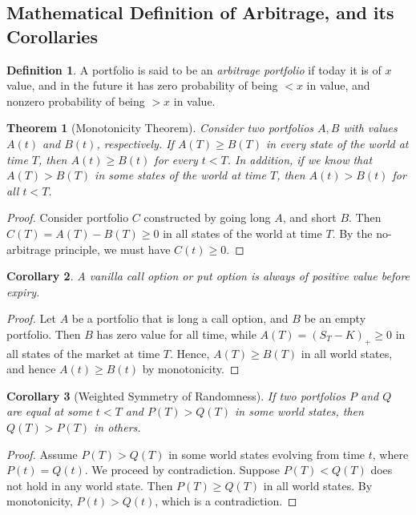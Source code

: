 \documentclass[12pt]{article}
\theoremstyle{plain}
\newtheorem{theorem}{Theorem}
\newtheorem{corollary}[theorem]{Corollary}
\theoremstyle{definition}
\newtheorem*{definition}{Definition}
\theoremstyle{remark}
\numberwithin{equation}{section}  %
\begin{document}
    \subsection{Mathematical Definition of Arbitrage, and its Corollaries}
    \begin{definition}
        A portfolio is said to be an \emph{arbitrage portfolio} if today it is
        of $x$ value, and in the future it has zero probability of being $<x$ in value,
        and nonzero probability of being $>x$ in value. 
    \end{definition}
    \begin{theorem}[Monotonicity Theorem]
    Consider two portfolios $A, B$ with values $A(t)$ and $B(t)$, respectively. 
    If $A(T) \ge B(T)$ in every state of the world at time $T$, then
    $A(t) \ge B(t)$ for every $t < T$. In addition, if we know that
    $A(T) > B(T)$ in some states of the world at time $T$, then
    $A(t) > B(t)$ for all $t < T$. 
    \end{theorem}
    \begin{proof}
    Consider portfolio $C$ constructed by going long $A$, and short $B$. Then
    $C(T) = A(T) - B(T) \ge 0$ in all states of the world at time $T$. 
    By the no-arbitrage principle, we must have $C(t) \ge 0$. \qedhere
    \end{proof}
    \begin{corollary}
    A vanilla call option or put option is always of positive value before expiry.
    \end{corollary}
    \begin{proof}
        Let $A$ be a portfolio that is long a call option, and $B$ be an empty
        portfolio.  Then $B$ has zero value for all time, while $A(T) = {(S_{T}
    - K)}_{+} \ge 0$ in all states of the market at time $T$. Hence, $A(T) \ge
    B(T)$ in all world states, and hence $A(t) \ge B(t)$ by monotonicity.
    \end{proof}
    \begin{corollary}[Weighted Symmetry of Randomness]
    If two portfolios $P$ and $Q$ are equal at some $t < T$ and $P(T) > Q(T)$
    in some world states, then $Q(T) > P(T)$ in others. 
    \end{corollary}
    \begin{proof}
    Assume $P(T) > Q(T)$ in some world states evolving from time $t$, where
    $P(t) = Q(t)$. We proceed by contradiction. Suppose $P(T) < Q(T)$ does not hold
    in any world state. Then $P(T) \ge Q(T)$ in all world states. By monotonicity,
    $P(t) > Q(t)$, which is a contradiction.
    \end{proof}
\end{document}
